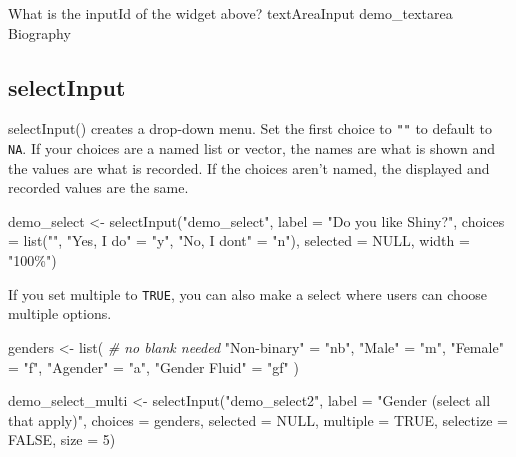 \documentclass[
]{book}
\newenvironment{Shaded}{\begin{snugshade}}{\end{snugshade}}
\newcommand{\AttributeTok}[1]{\textcolor[rgb]{0.77,0.63,0.00}{#1}}
\newcommand{\CommentTok}[1]{\textcolor[rgb]{0.56,0.35,0.01}{\textit{#1}}}
\newcommand{\ConstantTok}[1]{\textcolor[rgb]{0.00,0.00,0.00}{#1}}
\newcommand{\DecValTok}[1]{\textcolor[rgb]{0.00,0.00,0.81}{#1}}
\newcommand{\FunctionTok}[1]{\textcolor[rgb]{0.00,0.00,0.00}{#1}}
\newcommand{\NormalTok}[1]{#1}
\newcommand{\OtherTok}[1]{\textcolor[rgb]{0.56,0.35,0.01}{#1}}
\newcommand{\StringTok}[1]{\textcolor[rgb]{0.31,0.60,0.02}{#1}}
\begin{document}
What is the inputId of the widget above?
textAreaInput demo\_textarea Biography

\hypertarget{selectinput}{%
\subsection{selectInput}\label{selectinput}}

selectInput() creates a drop-down menu. Set the first choice to \texttt{""} to default to \texttt{NA}. If your choices are a named list or vector, the names are what is shown and the values are what is recorded. If the choices aren't named, the displayed and recorded values are the same.

\begin{Shaded}
\begin{Highlighting}[]
\NormalTok{demo\_select }\OtherTok{\textless{}{-}} 
  \FunctionTok{selectInput}\NormalTok{(}\StringTok{"demo\_select"}\NormalTok{, }
              \AttributeTok{label =} \StringTok{"Do you like Shiny?"}\NormalTok{, }
              \AttributeTok{choices =} \FunctionTok{list}\NormalTok{(}\StringTok{""}\NormalTok{, }
                             \StringTok{"Yes, I do"} \OtherTok{=} \StringTok{"y"}\NormalTok{, }
                             \StringTok{"No, I don\textquotesingle{}t"} \OtherTok{=} \StringTok{"n"}\NormalTok{),}
              \AttributeTok{selected =} \ConstantTok{NULL}\NormalTok{,}
              \AttributeTok{width =} \StringTok{"100\%"}\NormalTok{)}
\end{Highlighting}
\end{Shaded}

If you set multiple to \texttt{TRUE}, you can also make a select where users can choose multiple options.

\begin{Shaded}
\begin{Highlighting}[]
\NormalTok{genders }\OtherTok{\textless{}{-}} \FunctionTok{list}\NormalTok{( }\CommentTok{\# no blank needed}
  \StringTok{"Non{-}binary"} \OtherTok{=} \StringTok{"nb"}\NormalTok{,}
  \StringTok{"Male"} \OtherTok{=} \StringTok{"m"}\NormalTok{,}
  \StringTok{"Female"} \OtherTok{=} \StringTok{"f"}\NormalTok{,}
  \StringTok{"Agender"} \OtherTok{=} \StringTok{"a"}\NormalTok{,}
  \StringTok{"Gender Fluid"} \OtherTok{=} \StringTok{"gf"}
\NormalTok{)}

\NormalTok{demo\_select\_multi }\OtherTok{\textless{}{-}} 
  \FunctionTok{selectInput}\NormalTok{(}\StringTok{"demo\_select2"}\NormalTok{, }
              \AttributeTok{label =} \StringTok{"Gender (select all that apply)"}\NormalTok{, }
              \AttributeTok{choices =}\NormalTok{ genders,}
              \AttributeTok{selected =} \ConstantTok{NULL}\NormalTok{,}
              \AttributeTok{multiple =} \ConstantTok{TRUE}\NormalTok{, }
              \AttributeTok{selectize =} \ConstantTok{FALSE}\NormalTok{,}
              \AttributeTok{size =} \DecValTok{5}\NormalTok{)}
\end{Highlighting}
\end{Shaded}
\end{document}
